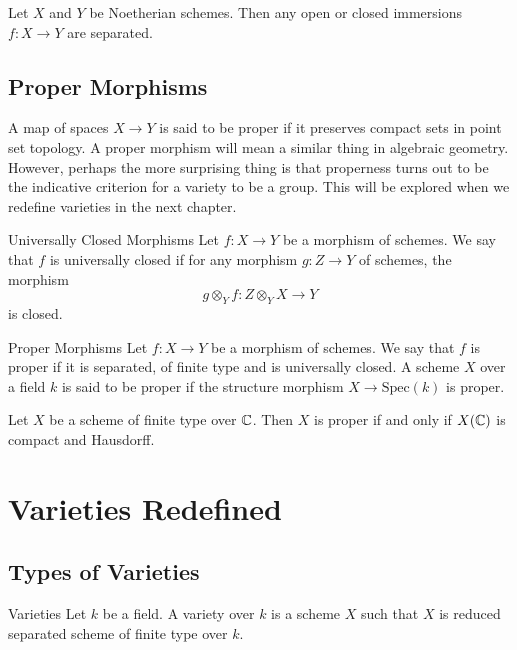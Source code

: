 \documentclass[a4paper]{article}
\begin{document}
\begin{prp}{}{} Let $X$ and $Y$ be Noetherian schemes. Then any open or closed immersions $f:X\to Y$ are separated. 
\end{prp}

\subsection{Proper Morphisms}
A map of spaces $X\to Y$ is said to be proper if it preserves compact sets in point set topology. A proper morphism will mean a similar thing in algebraic geometry. However, perhaps the more surprising thing is that properness turns out to be the indicative criterion for a variety to be a group. This will be explored when we redefine varieties in the next chapter. 

\begin{defn}{Universally Closed Morphisms}{} Let $f:X\to Y$ be a morphism of schemes. We say that $f$ is universally closed if for any morphism $g:Z\to Y$ of schemes, the morphism $$g\otimes_Yf:Z\otimes_YX\to Y$$ is closed. 
\end{defn}

\begin{defn}{Proper Morphisms}{} Let $f:X\to Y$ be a morphism of schemes. We say that $f$ is proper if it is separated, of finite type and is universally closed. A scheme $X$ over a field $k$ is said to be proper if the structure morphism $X\to\text{Spec}(k)$ is proper. 
\end{defn}

\begin{thm}{}{} Let $X$ be a scheme of finite type over $\mathbb{C}$. Then $X$ is proper if and only if $X(\mathbb{C})$ is compact and Hausdorff. 
\end{thm}

\pagebreak
\section{Varieties Redefined}
\subsection{Types of Varieties}
\begin{defn}{Varieties}{} Let $k$ be a field. A variety over $k$ is a scheme $X$ such that $X$ is reduced separated scheme of finite type over $k$. 
\end{defn}
\end{document}
